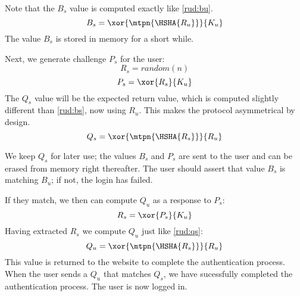 Note that the \(B_s\) value is computed exactly like \eqref{rud:bu}.
\begin{equation}\label{rud:bs}
B_s = \xor{\mtpn{\HSHA{R_u}}}{K_u}
\end{equation}
The value \(B_s\) is stored in memory for a short while.
\par
Next, we generate challenge \(P_s\) for the user:
\begin{equation}\label{rud:rs}
R_s = random(n)
\end{equation}
\begin{equation}\label{rud:ps}
P_s = \xor{R_s}{K_u}
\end{equation}
The \(Q_s\) value will be the expected return value, which is computed slightly different than \eqref{rud:bs}, now using \(R_u\).
This makes the protocol asymmetrical by design.
\begin{equation}\label{rud:qs}
Q_s = \xor{\mtpn{\HSHA{R_s}}}{R_u}
\end{equation}
\par
We keep \(Q_s\) for later use; the values \(B_s\) and \(P_s\) are sent to the user and can be erased from memory right thereafter.
The user should assert that value \(B_s\) is  matching \(B_u\);
if not, the login has failed.
\par
If they match, we then can compute \(Q_u\) as a response to \(P_s\):
\begin{equation}
R_s = \xor{P_s}{K_u}
\end{equation}
Having extracted \(R_s\) we compute \(Q_u\) just like \eqref{rud:qs}:
\begin{equation}
Q_u = \xor{\mtpn{\HSHA{R_s}}}{R_u}
\end{equation}
This value is returned to the website to complete the authentication process.
When the user sends a \(Q_u\) that matches \(Q_s\), we have sucessfully completed the authentication process.
The user is now logged in.



